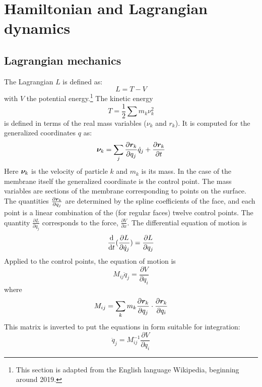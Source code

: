 
\section{ Hamiltonian and Lagrangian dynamics } \label{sec:hamilton}

\subsection{Lagrangian mechanics}


The Lagrangian $L$ is defined as:
\begin{equation}
L = T - V
\end{equation}
with $V$ the potential energy.\footnote{This section is adapted from the English language Wikipedia, beginning around 2019.}
The kinetic energy
\begin{equation}
T = \frac{1}{2} \sum m_k \nu_k^2
\end{equation}
is defined in terms of the real mass variables ($\nu_k$ and $r_k$). 
It is computed for the generalized coordinates $q$ as:
\begin{equation}
\boldsymbol{\nu}_k = \sum_j{\frac{\partial \boldsymbol{r}_k}{\partial q_j} \dot{q}_j} + \frac{\partial \boldsymbol{r}_k}{\partial t}
\end{equation}
Here $\boldsymbol{\nu}_k$ is the velocity of particle $k$ and $m_k$ is its mass.
In the case of the membrane itself the generalized coordinate is the control point.
The mass variables are sections of the membrane corresponding to points on the surface.
The quantities $\frac{\partial \boldsymbol{r}_k}{\partial q_j}$ are determined by the spline coefficients of the face, and each point is a linear combination of the (for regular faces) twelve control points.
The quantity $\frac{\partial L}{\partial q_j}$ corresponds to the force, $\frac{\partial V}{\partial x}$.
The differential equation of motion is 
\begin{equation}
\frac{\textrm{d}}{\textrm{d}t} {\huge (} \frac{\partial L}{\partial \dot{q}_j} {\huge )} = \frac{\partial L}{\partial q_j}
\end{equation}
Applied to the control points, the equation of motion is
\begin{equation}
M_{ij} \ddot{q}_j = \frac{\partial V}{\partial q_i}
\end{equation}
where 
\begin{equation}
M_{ij} = \sum_k m_k \frac{ \partial { \boldsymbol{r}_k } }{\partial q_j} \cdot \frac{\partial{\boldsymbol{r}_k}}{\partial q_i}
\end{equation}
This matrix is inverted to put the equations in form suitable for integration:
\begin{equation}
\ddot{q}_j = M^{-1}_{ij} \frac{\partial V}{\partial q_i}
\end{equation}

